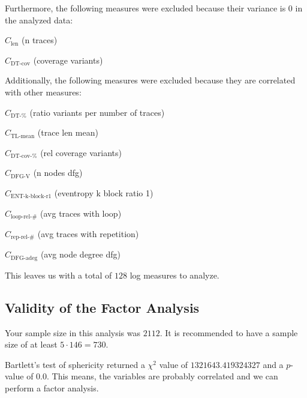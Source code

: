 \documentclass[a4paper]{article}
\newcommand{\lengthname}{\text{len}}
\newcommand{\length}{C_{\lengthname}}
\newcommand{\tlavgname}{\text{TL-mean}}
\newcommand{\tlavg}{C_{\tlavgname}}
\newcommand{\percentageuniquetracesname}{\text{DT-\%}}
\newcommand{\percentageuniquetraces}{C_{\percentageuniquetracesname}}
\newcommand{\dtcovname}{\text{DT-cov}}
\newcommand{\dtcov}{C_{\dtcovname}}
\newcommand{\dtrelcovname}{\text{DT-cov-\%}}
\newcommand{\dtrelcov}{C_{\dtrelcovname}}
\newcommand{\looprelnumname}{\text{loop-rel-\#}}
\newcommand{\looprelnum}{C_{\looprelnumname}}
\newcommand{\reprelnumname}{\text{rep-rel-\#}}
\newcommand{\reprelnum}{C_{\reprelnumname}}
\newcommand{\dfgnodesname}{\text{DFG-V}}
\newcommand{\dfgnodes}{C_{\dfgnodesname}}
\newcommand{\dfgavgdegname}{\text{DFG-adeg}}
\newcommand{\dfgavgdeg}{C_{\dfgavgdegname}}
\newcommand{\entkblockronename}{\text{ENT-k-block-r1}}
\newcommand{\entkblockrone}{C_{\entkblockronename}}
\begin{document}
\bigskip
\noindent
Furthermore, the following measures were excluded because their variance is $0$ in the analyzed data:
\begin{compactenum}
\item $\length$ (n traces)
\item $\dtcov$ (coverage variants)
\end{compactenum}

\bigskip
\noindent
Additionally, the following measures were excluded because they are correlated with other measures:
\begin{compactenum}
\item $\percentageuniquetraces$ (ratio variants per number of traces)
\item $\tlavg$ (trace len mean)
\item $\dtrelcov$ (rel coverage variants)
\item $\dfgnodes$ (n nodes dfg)
\item $\entkblockrone$ (eventropy k block ratio 1)
\item $\looprelnum$ (avg traces with loop)
\item $\reprelnum$ (avg traces with repetition)
\item $\dfgavgdeg$ (avg node degree dfg)
\end{compactenum}

\bigskip
\noindent
This leaves us with a total of $128$ log measures to analyze.

\subsection*{Validity of the Factor Analysis}
Your sample size in this analysis was $2112$.
It is recommended to have a sample size of at least $5 \cdot 146 = 730$.

\noindent 
Bartlett's test of sphericity returned a $\chi^2$ value of $1321643.419324327$ and a $p$-value of $0.0$.
This means, the variables are probably correlated and we can perform a factor analysis.
\end{document}
